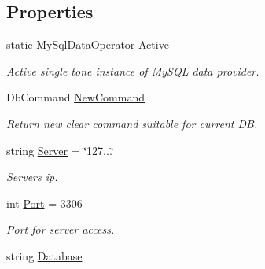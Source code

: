 \subsection*{Properties}
\begin{DoxyCompactItemize}
\item 
static \mbox{\hyperlink{class_uniform_data_operator_1_1_sql_1_1_my_sql_1_1_my_sql_data_operator}{My\+Sql\+Data\+Operator}} \mbox{\hyperlink{class_uniform_data_operator_1_1_sql_1_1_my_sql_1_1_my_sql_data_operator_a8e8f8f936f6a4306dc4dc0d3eb07770c}{Active}}
\begin{DoxyCompactList}\small\item\em Active single tone instance of My\+S\+QL data provider. \end{DoxyCompactList}\item 
Db\+Command \mbox{\hyperlink{class_uniform_data_operator_1_1_sql_1_1_my_sql_1_1_my_sql_data_operator_aed89486b1b51de67c62a97c160dcf048}{New\+Command}}
\begin{DoxyCompactList}\small\item\em Return new clear command suitable for current DB. \end{DoxyCompactList}\item 
string \mbox{\hyperlink{class_uniform_data_operator_1_1_sql_1_1_my_sql_1_1_my_sql_data_operator_a2154fef9e522ef26cf08642483fed223}{Server}} = \char`\"{}127...\char`\"{}
\begin{DoxyCompactList}\small\item\em Server\textquotesingle{}s ip. \end{DoxyCompactList}\item 
int \mbox{\hyperlink{class_uniform_data_operator_1_1_sql_1_1_my_sql_1_1_my_sql_data_operator_a2cfc65d2842491734270dfe114d9eec5}{Port}} = 3306
\begin{DoxyCompactList}\small\item\em Port for server access. \end{DoxyCompactList}\item 
string \mbox{\hyperlink{class_uniform_data_operator_1_1_sql_1_1_my_sql_1_1_my_sql_data_operator_a144616e12acb2b55c7046af0c9af989d}{Database}}

\end{DoxyCompactItemize}
